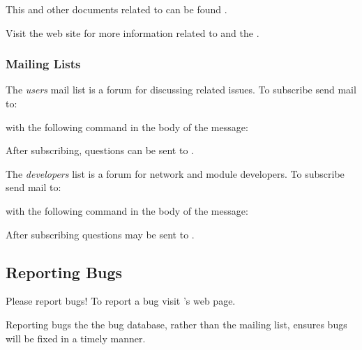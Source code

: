 This and other documents related to \sr{} can be found 
.

Visit the \sci{} web site for more
information related to \sr{} and the \scii{}.

\subsubsection{Mailing Lists}

The \sr{} \emph{users} mail list is a forum for discussing \sr{}
related issues.  To subscribe send mail to:


with the following command in the body of the message:


After subscribing,  questions can be sent to
.

The \sr{} \emph{developers} list is a forum for network and module
developers.  To subscribe send mail to:


with the following command in the body of the message:


After subscribing  questions may be sent to
.

\subsection{Reporting Bugs}
\label{sec:bugs}

Please report bugs!  To report a bug visit \sr{}'s
 web page.

Reporting bugs the the bug database, rather than the mailing list,  ensures
bugs will be fixed in a timely manner.


